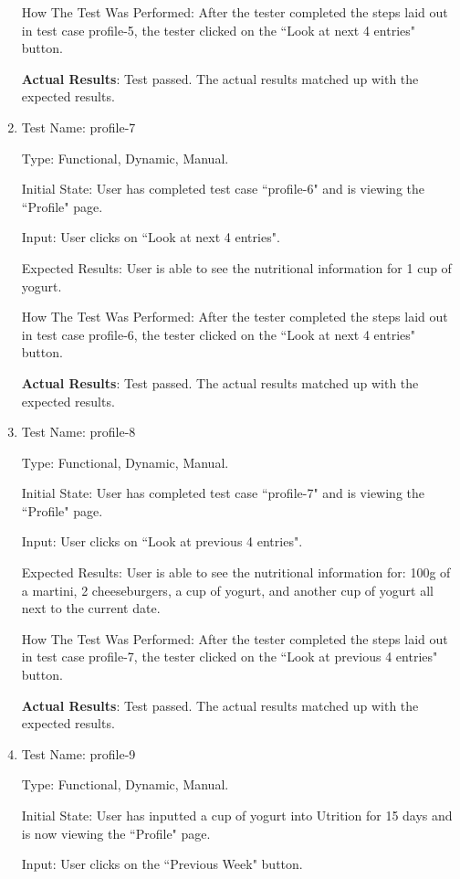 \documentclass[12pt, titlepage]{article}
\begin{document}
\begin{enumerate}
		How The Test Was Performed: After the tester completed the steps laid out in test case profile-5, the tester clicked on the ``Look at next 4 entries" button.
		
		\textbf{Actual Results}: Test passed. The actual results matched up with the expected results.
		
		\item{Test Name: profile-7}
		
		Type: Functional, Dynamic, Manual.
		
		Initial State: User has completed test case ``profile-6" and is viewing the ``Profile" page.
		
		Input: User clicks on ``Look at next 4 entries".
		
		Expected Results: User is able to see the nutritional information for 1 cup of yogurt.
		
		How The Test Was Performed: After the tester completed the steps laid out in test case profile-6, the tester clicked on the ``Look at next 4 entries" button.
		
		\textbf{Actual Results}: Test passed. The actual results matched up with the expected results.
		
		\item{Test Name: profile-8}
		
		Type: Functional, Dynamic, Manual.
		
		Initial State: User has completed test case ``profile-7" and is viewing the ``Profile" page.
		
		Input: User clicks on ``Look at previous 4 entries".
		
		Expected Results: User is able to see the nutritional information for: 100g of a martini, 2 cheeseburgers, a cup of yogurt, and another cup of yogurt all next to the current date.
		
		How The Test Was Performed: After the tester completed the steps laid out in test case profile-7, the tester clicked on the ``Look at previous 4 entries" button.
		
		\textbf{Actual Results}: Test passed. The actual results matched up with the expected results.
		
		\item{Test Name: profile-9}
		
		Type: Functional, Dynamic, Manual.
		
		Initial State: User has inputted a cup of yogurt into Utrition for 15 days and is now viewing the ``Profile" page.
		
		Input: User clicks on the ``Previous Week" button.
		

\end{enumerate}
\end{document}
